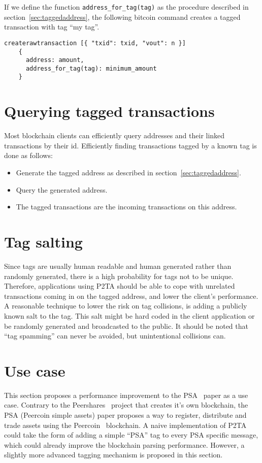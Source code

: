 \documentclass[a4paper,10pt]{article}
\begin{document}
If we define the function \verb|address_for_tag(tag)| as the procedure described in section~\ref{sec:taggedaddress}, the following bitcoin command creates a tagged transaction with tag ``my tag''.
\begin{verbatim}
createrawtransaction [{ "txid": txid, "vout": n }]
    {
      address: amount,
      address_for_tag(tag): minimum_amount
    }
\end{verbatim}


\section{Querying tagged transactions}
Most blockchain clients can efficiently query addresses and their linked transactions by their id.
Efficiently finding transactions tagged by a known tag is done as follows:
\begin{itemize}
 \item Generate the tagged address as described in section~\ref{sec:taggedaddress}.
 \item Query the generated address.
 \item The tagged transactions are the incoming transactions on this address.
\end{itemize}


\section{Tag salting}
Since tags are usually human readable and human generated rather than randomly generated, there is a high probability for tags not to be unique.
Therefore, applications using P2TA should be able to cope with unrelated transactions coming in on the tagged address, and lower the client's performance.
A reasonable technique to lower the risk on tag collisions, is adding a publicly known salt to the tag.
This salt might be hard coded in the client application or be randomly generated and broadcasted to the public.
It should be noted that ``tag spamming'' can never be avoided, but unintentional collisions can.


\section{Use case}
This section proposes a performance improvement to the PSA~\cite{Pchem} paper as a use case.
Contrary to the Peershares~\cite{TODO} project that creates it's own blockchain, the PSA (Peercoin simple assets) paper proposes a way to register, distribute and trade assets using the Peercoin~\cite{TODO} blockchain.
A naive implementation of P2TA could take the form of adding a simple ``PSA'' tag to every PSA specific message, which could already improve the blockchain parsing performance.
However, a slightly more advanced tagging mechanism is proposed in this section.
\end{document}
